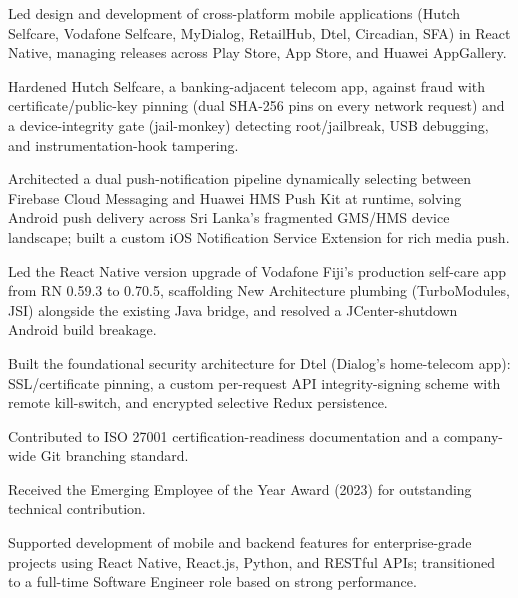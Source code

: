 \documentclass[10.5pt]{article}
\begin{document}
\begin{cvitems}
  \item Led design and development of cross-platform mobile applications (Hutch Selfcare, Vodafone Selfcare, MyDialog, RetailHub, Dtel, Circadian, SFA) in React Native, managing releases across Play Store, App Store, and Huawei AppGallery.
  \item Hardened Hutch Selfcare, a banking-adjacent telecom app, against fraud with certificate/public-key pinning (dual SHA-256 pins on every network request) and a device-integrity gate (jail-monkey) detecting root/jailbreak, USB debugging, and instrumentation-hook tampering.
  \item Architected a dual push-notification pipeline dynamically selecting between Firebase Cloud Messaging and Huawei HMS Push Kit at runtime, solving Android push delivery across Sri Lanka's fragmented GMS/HMS device landscape; built a custom iOS Notification Service Extension for rich media push.
  \item Led the React Native version upgrade of Vodafone Fiji's production self-care app from RN 0.59.3 to 0.70.5, scaffolding New Architecture plumbing (TurboModules, JSI) alongside the existing Java bridge, and resolved a JCenter-shutdown Android build breakage.
  \item Built the foundational security architecture for Dtel (Dialog's home-telecom app): SSL/certificate pinning, a custom per-request API integrity-signing scheme with remote kill-switch, and encrypted selective Redux persistence.
  \item Contributed to ISO 27001 certification-readiness documentation and a company-wide Git branching standard.
  \item Received the Emerging Employee of the Year Award (2023) for outstanding technical contribution.
\end{cvitems}

\begin{cvitems}
  \item Supported development of mobile and backend features for enterprise-grade projects using React Native, React.js, Python, and RESTful APIs; transitioned to a full-time Software Engineer role based on strong performance.
\end{cvitems}
\end{document}
